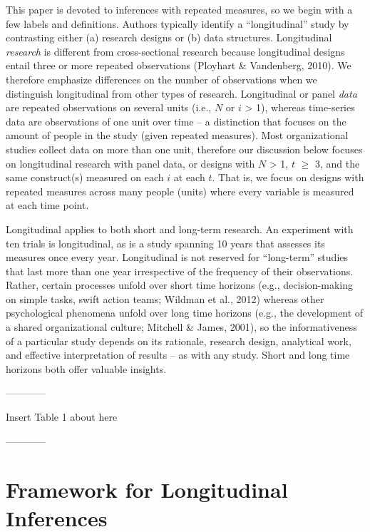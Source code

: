 \documentclass[english,,man]{apa6}
\theoremstyle{definition}
\theoremstyle{definition}
\theoremstyle{definition}
\theoremstyle{remark}
\begin{document}
This paper is devoted to inferences with repeated measures, so we begin
with a few labels and definitions. Authors typically identify a
\enquote{longitudinal} study by contrasting either (a) research designs
or (b) data structures. Longitudinal \emph{research} is different from
cross-sectional research because longitudinal designs entail three or
more repeated observations (Ployhart \& Vandenberg, 2010). We therefore
emphasize differences on the number of observations when we distinguish
longitudinal from other types of research. Longitudinal or panel
\emph{data} are repeated observations on several units (i.e., \(N\) or
\(i\) \textgreater{} 1), whereas time-series data are observations of
one unit over time -- a distinction that focuses on the amount of people
in the study (given repeated measures). Most organizational studies
collect data on more than one unit, therefore our discussion below
focuses on longitudinal research with panel data, or designs with \(N\)
\textgreater{} 1, \(t\) \(\geq\) 3, and the same construct(s) measured
on each \(i\) at each \(t\). That is, we focus on designs with repeated
measures across many people (units) where every variable is measured at
each time point.

Longitudinal applies to both short and long-term research. An experiment
with ten trials is longitudinal, as is a study spanning 10 years that
assesses its measures once every year. Longitudinal is not reserved for
\enquote{long-term} studies that last more than one year irrespective of
the frequency of their observations. Rather, certain processes unfold
over short time horizons (e.g., decision-making on simple tasks, swift
action teams; Wildman et al., 2012) whereas other psychological
phenomena unfold over long time horizons (e.g., the development of a
shared organizational culture; Mitchell \& James, 2001), so the
informativeness of a particular study depends on its rationale, research
design, analytical work, and effective interpretation of results -- as
with any study. Short and long time horizons both offer valuable
insights.

\begin{center}

------------

Insert Table 1 about here

------------

\end{center}

\hypertarget{framework-for-longitudinal-inferences}{%
\section{Framework for Longitudinal
Inferences}\label{framework-for-longitudinal-inferences}}
\end{document}
